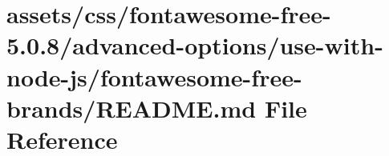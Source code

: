 \hypertarget{css_2fontawesome-free-5_80_88_2advanced-options_2use-with-node-js_2fontawesome-free-brands_2_r_e_a_d_m_e_8md}{}\section{assets/css/fontawesome-\/free-\/5.0.8/advanced-\/options/use-\/with-\/node-\/js/fontawesome-\/free-\/brands/\+R\+E\+A\+D\+ME.md File Reference}
\label{css_2fontawesome-free-5_80_88_2advanced-options_2use-with-node-js_2fontawesome-free-brands_2_r_e_a_d_m_e_8md}
